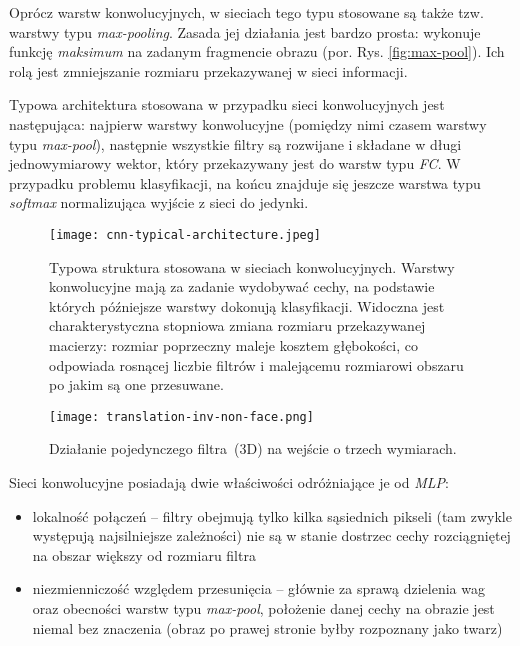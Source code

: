 Oprócz warstw konwolucyjnych, w sieciach tego typu stosowane są także tzw. warstwy typu \textit{max-pooling}. Zasada jej działania jest bardzo prosta: wykonuje funkcję \textit{maksimum} na zadanym fragmencie obrazu (por. Rys. \ref{fig:max-pool}). Ich rolą jest zmniejszanie rozmiaru przekazywanej w sieci informacji.

Typowa architektura stosowana w przypadku sieci konwolucyjnych jest następująca: najpierw warstwy konwolucyjne (pomiędzy nimi czasem warstwy typu \textit{max-pool}), następnie wszystkie filtry są rozwijane i składane w długi jednowymiarowy wektor, który przekazywany jest do warstw typu \textit{FC}. W przypadku problemu klasyfikacji, na końcu znajduje się jeszcze warstwa typu \textit{softmax} normalizująca wyjście z sieci do jedynki.

\begin{figure}[h]
	\centering
	\texttt{[image: cnn-typical-architecture.jpeg]}
	\caption{Typowa struktura stosowana w sieciach konwolucyjnych. Warstwy konwolucyjne mają za zadanie wydobywać cechy, na podstawie których późniejsze warstwy dokonują klasyfikacji.
	Widoczna jest charakterystyczna stopniowa zmiana rozmiaru przekazywanej macierzy: rozmiar poprzeczny maleje kosztem głębokości, co odpowiada rosnącej liczbie filtrów i malejącemu rozmiarowi obszaru po jakim są one przesuwane.}
	\label{fig:cnn-arch}
\end{figure}


\begin{wrapfigure}[11]{r}{0.3\textwidth}
  \begin{center}
  	\vspace{-2em}
	\texttt{[image: translation-inv-non-face.png]}
	\begin{minipage}[c]{0.25\textwidth}
	\vspace{1em}
    \caption{Działanie pojedynczego filtra~(3D) na wejście o trzech wymiarach.}
   	\label{fig:translation-inv-nonface}
    \end{minipage}
  \end{center}
\end{wrapfigure}


Sieci konwolucyjne posiadają dwie właściwości odróżniające je od \textit{MLP}:
\begin{itemize}
	\item lokalność połączeń -- filtry obejmują tylko kilka sąsiednich pikseli (tam zwykle występują najsilniejsze zależności) nie są w stanie dostrzec cechy rozciągniętej na obszar większy od rozmiaru filtra
	\item niezmienniczość względem przesunięcia  -- głównie za sprawą dzielenia wag oraz obecności warstw typu \textit{max-pool}, położenie danej cechy na obrazie jest niemal bez znaczenia (obraz po prawej stronie byłby rozpoznany jako twarz)
\end{itemize}

